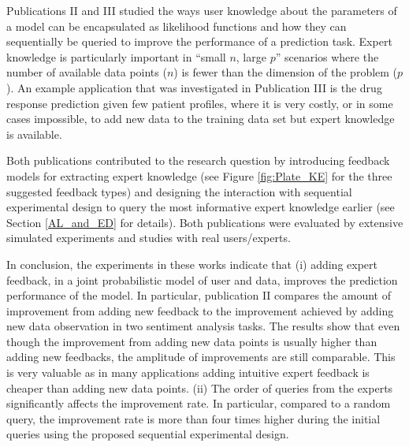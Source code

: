 \documentclass[dissertation,math,vertlayout,pdfa,colorlinks]{aaltoseries}
\begin{document}
Publications II and III studied the ways user knowledge about the parameters of a model can be encapsulated as likelihood functions and how they can sequentially be queried to improve the performance of a prediction task. Expert knowledge is particularly important in ``small $n$, large $p$'' scenarios where the number of available data points ($n$) is fewer than the dimension of the problem ($p$). An example application that was investigated in Publication III is the drug response prediction given few patient profiles, where it is very costly, or in some cases impossible, to add new data to the training data set but expert knowledge is available. 

Both publications contributed to the research question by introducing feedback models for extracting expert knowledge (see Figure \ref{fig:Plate_KE} for the three suggested feedback types) and designing the interaction with sequential experimental design to query the most informative expert knowledge earlier (see Section \ref{AL_and_ED} for details). Both publications were evaluated by extensive simulated experiments and studies with real users/experts.

In conclusion, the experiments in these works indicate that (i) adding expert feedback, in a joint probabilistic model of user and data, improves the prediction performance of the model. In particular, publication II compares the amount of improvement from adding new feedback to the improvement achieved by adding new data observation in two sentiment analysis tasks. The results show that even though the improvement from adding new data points is usually higher than adding new feedbacks, the amplitude of improvements are still comparable. This is very valuable as in many applications adding intuitive expert feedback is cheaper than adding new data points. (ii) The order of queries from the experts significantly affects the improvement rate. In particular, compared to a random query, the improvement rate is more than four times higher during the initial queries using the proposed sequential experimental design.

\end{document}
